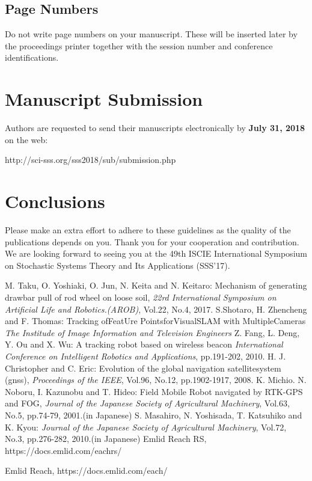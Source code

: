 \documentclass[a4paper]{article}
\begin{document}
\subsection{Page Numbers}
Do not write page numbers on your manuscript.
These will be inserted later by the proceedings printer together with
the session number and conference identifications.


\section{Manuscript Submission}
Authors are requested to send their manuscripts electronically by
{\bf July 31, 2018} on the web:
\begin{center}
http://sci-sss.org/sss2018/sub/submission.php
\end{center}


\section{Conclusions}

Please make an extra effort to adhere to these guidelines as the quality
of the publications depends on you.
Thank you for your cooperation and contribution.
We are looking forward to seeing you at the 49th ISCIE International Symposium
on Stochastic Systems Theory and Its Applications (SSS'17).


\begin{thebibliography}{99}
M. Taku, O. Yoshiaki, O. Jun, N. Keita and N. Keitaro:
Mechanism of generating drawbar pull of rod wheel on loose soil,
{\it 22rd International Symposium on Artificial Life and Robotics.(AROB)}, Vol.22, No.4, 2017.
S.Shotaro, H. Zhencheng and F. Thomas:
Tracking ofFeatUre PointsforVisualSLAM with MultipleCameras
{\it The Institude of Image Information and Television Engineers}
Z. Fang, L. Deng, Y. Ou and X. Wu:
A tracking robot based on wireless beacon
{\it International Conference on Intelligent Robotics and Applications}, pp.191-202, 2010.
H. J. Christopher and C. Eric:
Evolution of the global navigation satellitesystem (gnss),
{\it Proceedings of the IEEE}, Vol.96, No.12, pp.1902-1917, 2008.
K. Michio. N. Noboru, I. Kazunobu and T. Hideo: 
Field Mobile Robot navigated by RTK-GPS and FOG, 
{\it Journal of the Japanese Society of Agricultural Machinery}, Vol.63, No.5, pp.74-79, 2001.(in Japanese)
S. Masahiro, N. Yoshisada, T. Katsuhiko and K. Kyou: 
{\it Journal of the Japanese Society of Agricultural Machinery}, Vol.72, No.3, pp.276-282, 2010.(in Japanese)
Emlid Reach RS, https://docs.emlid.com/eachrs/

Emlid Reach, https://docs.emlid.com/each/

\end{thebibliography}
\end{document}

